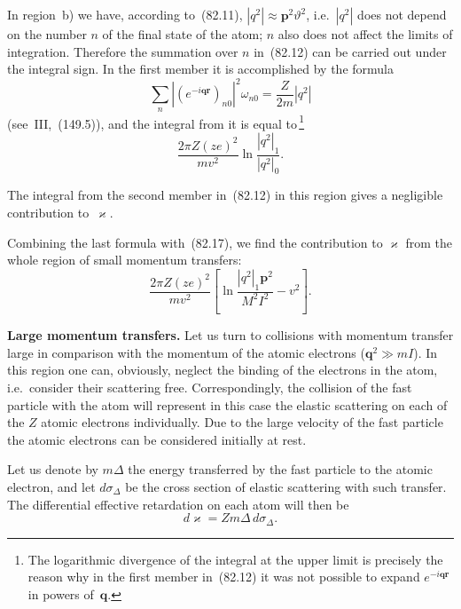 In region~b) we have, according to~(82.11), $|q^2| \approx \mathbf{p}^2\vartheta^2$, i.e.\ $|q^2|$ does not depend on the number $n$ of the final state of the atom; $n$ also does not affect the limits of integration. Therefore the summation over $n$ in~(82.12) can be carried out under the integral sign. In the first member it is accomplished by the formula
\begin{equation}
\sum_n|(e^{-i\mathbf{qr}})_{n0}|^2\omega_{n0} = \frac{Z}{2m}|q^2|
\tag{82.19}
\end{equation}
(see~III,~(149.5)), and the integral from it is equal to\,\footnote{The logarithmic divergence of the integral at the upper limit is precisely the reason why in the first member in~(82.12) it was not possible to expand $e^{-i\mathbf{qr}}$ in powers of~$\mathbf{q}$.}
\[
\frac{2\pi Z(ze)^2}{mv^2}\ln\frac{|q^2|_1}{|q^2|_0}.
\]

The integral from the second member in~(82.12) in this region gives a negligible contribution to~$\varkappa$.

Combining the last formula with~(82.17), we find the contribution to $\varkappa$ from the whole region of small momentum transfers:
\begin{equation}
\frac{2\pi Z(ze)^2}{mv^2}\left[\ln\frac{|q^2|_1\mathbf{p}^2}{M^2 I^2} - v^2\right].
\tag{82.20}
\end{equation}

\textbf{Large momentum transfers.} Let us turn to collisions with momentum transfer large in comparison with the momentum of the atomic electrons ($\mathbf{q}^2 \gg mI$). In this region one can, obviously, neglect the binding of the electrons in the atom, i.e.\ consider their scattering free. Correspondingly, the collision of the fast particle with the atom will represent in this case the elastic scattering on each of the $Z$ atomic electrons individually. Due to the large velocity of the fast particle the atomic electrons can be considered initially at rest.

Let us denote by $m\Delta$ the energy transferred by the fast particle to the atomic electron, and let $d\sigma_\Delta$ be the cross section of elastic scattering with such transfer. The differential effective retardation on each atom will then be
\begin{equation}
d\varkappa = Zm\Delta\,d\sigma_\Delta.
\tag{82.21}
\end{equation}

